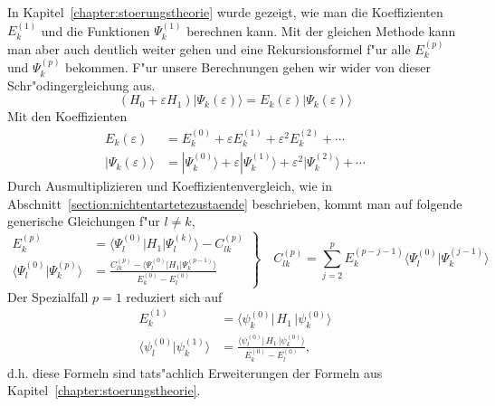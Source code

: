 \begin{refsection}
In Kapitel~\ref{chapter:stoerungstheorie} wurde gezeigt,
wie man die Koeffizienten $E_k^{(1)}$ und die 
Funktionen $\Psi_k^{(1)}$ berechnen kann. Mit der gleichen Methode kann man 
aber auch deutlich weiter gehen und eine Rekursionsformel f"ur alle 
$E_k^{(p)}$ und $\Psi_k^{(p)}$ bekommen.
F"ur unsere Berechnungen gehen wir wider von dieser Schr"odingergleichung aus.
\begin{equation}
(H_0+\varepsilon H_1)|\Psi_k(\varepsilon)\rangle
=
E_k(\varepsilon)|\Psi_k(\varepsilon)\rangle
\end{equation}
Mit den Koeffizienten
\begin{align*}
E_k(\varepsilon)
&=
E_k^{(0)}+\varepsilon E_k^{(1)}+\varepsilon^2 E_k^{(2)}+\dotsb
\\
|\Psi_k(\varepsilon)\rangle
&=
|\Psi_k^{(0)}\rangle+\varepsilon|\Psi_k^{(1)}\rangle+
\varepsilon^2|\Psi_k^{(2)}\rangle+\dotsb
\end{align*}
Durch Ausmultiplizieren und Koeffizientenvergleich,
wie in Abschnitt~\ref{section:nichtentartetezustaende} beschrieben,
kommt man auf folgende generische Gleichungen f"ur $l \neq k$,
\begin{equation}
\left.
\begin{aligned}
E_k^{(p)}
&=
\langle\Psi_l^{(0)}|H_1|\Psi_l^{(k)}\rangle-C_{lk}^{(p)}
\\
\langle\Psi_l^{(0)}|\Psi_k^{(p)}\rangle
&=
\frac{C_{lk}^{(p)}-\langle\Psi_l^{(0)}|H_1|\Psi_k^{(p-1)}\rangle}
{E_k^{(0)}-E_l^{(0)}}
\end{aligned}
\right\}
\quad
C_{lk}^{(p)}
=
\displaystyle\sum_{j=2}^{p} E_k^{(p-j-1)}
\langle\Psi_l^{(0)}|\Psi_k^{(j-1)}\rangle
\end{equation}
Der Spezialfall $p=1$ reduziert sich auf
\begin{equation}
\begin{aligned}
E_k^{(1)}
&=
\langle \psi_k^{(0)}|\, H_1 \,|\psi_k^{(0)}\rangle
\\
\langle\psi_l^{(0)}|\psi_k^{(1)}\rangle
&=
\frac{\langle \psi_l^{(0)}|\, H_1 \,|\psi_k^{(0)}\rangle}{E_k^{(0)}-E_l^{(0)}},
\end{aligned}
\end{equation}
d.h. diese Formeln sind tats"achlich Erweiterungen der Formeln aus
Kapitel~\ref{chapter:stoerungstheorie}.

\end{refsection}
